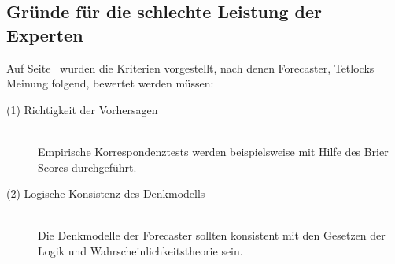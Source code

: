  
\subsection{Gründe für die schlechte Leistung der Experten}

Auf Seite~\pageref{misc:Emp_Korr} wurden die Kriterien vorgestellt, nach denen
Forecaster, Tetlocks Meinung folgend, bewertet werden müssen:

\begin{description}

\item[(1) Richtigkeit der Vorhersagen] \hfill \\
Empirische Korrespondenztests werden beispielsweise mit Hilfe des Brier Scores
durchgeführt.

\item[(2) Logische Konsistenz des Denkmodells] \hfill \\
Die Denkmodelle der Forecaster sollten konsistent mit den Gesetzen der Logik
und Wahrscheinlichkeitstheorie sein.

\end{description}

